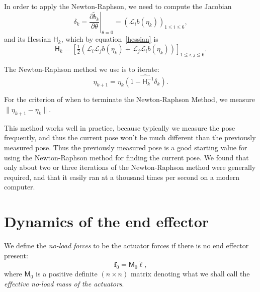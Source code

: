 \documentclass[reqno,12pt]{amsart}
\newcommand{\liederiv}{\mathcal L}
\begin{document}
In order to apply the Newton-Raphson, we need to compute the Jacobian
\begin{equation}
\label{jacobian}
\delta_k = \left.\frac{\partial\tilde b_k}{\partial\theta} \right|_{\theta = 0} = (\liederiv_i b(\eta_k))_{1 \le i \le 6},
\end{equation}
and its Hessian $\mathsf H_k$, which by equation~\eqref{hessian} is
\begin{equation}
\mathsf H_k
= \left[\tfrac12 (\liederiv_i \liederiv_j b(\eta_k) + \liederiv_j \liederiv_i b(\eta_k)) \right]_{1\le i,j\le 6}.
\end{equation}

The Newton-Raphson method we use is to iterate:
\begin{equation}
\eta_{k+1} = \eta_k \widehat{(1 - \mathsf H_k^{-1} \delta_k)} .
\end{equation}

For the criterion of when to terminate the Newton-Raphson Method, we measure $\|\eta_{k+1} - \eta_k\|$.

This method works well in practice, because typically we measure the pose frequently, and thus the current pose won't be much different than the previously measured pose.  Thus the previously measured pose is a good starting value for using the Newton-Raphson method for finding the current pose.  We found that only about two or three iterations of the Newton-Raphson method were generally required, and that it easily ran at a thousand times per second on a modern computer.

\section{Dynamics of the end effector}
\label{dynamics}

We define the \emph{no-load forces} to be the actuator forces if there is no end effector present:
\begin{equation}
\bm f_0 = \mathsf M_0 \ddot{\bm \ell},
\end{equation}
where $\mathsf M_0$ is a positive definite $(n\times n)$ matrix denoting what we shall call the \emph{effective no-load mass of the actuators}.
\end{document}
